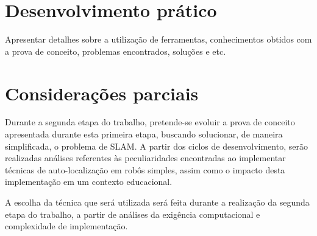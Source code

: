 








\section{Desenvolvimento prático} %
\label{sec:desenvolvimento_prático}

	Apresentar detalhes sobre a utilização de ferramentas, conhecimentos obtidos com a prova de conceito, problemas encontrados, soluções e etc.

\section{Considerações parciais} %
\label{sec:consideracoes}

	Durante a segunda etapa do trabalho, pretende-se evoluir a prova de conceito apresentada durante esta primeira etapa, buscando solucionar, de maneira simplificada, o problema de SLAM. A partir dos ciclos de desenvolvimento, serão realizadas análises referentes às peculiaridades encontradas ao implementar técnicas de auto-localização em robôs simples, assim como o impacto desta implementação em um contexto educacional.

	A escolha da técnica que será utilizada será feita durante a realização da segunda etapa do trabalho, a partir de análises da exigência computacional e complexidade de implementação.

